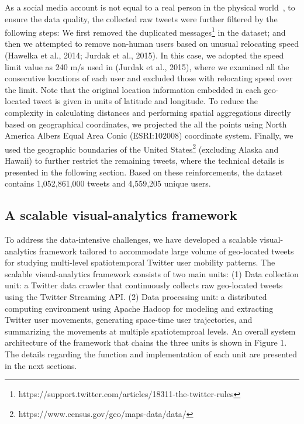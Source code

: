 \documentclass[ijgi,article,submit,moreauthors,pdftex,10pt,a4paper]{mdpi}
\theoremstyle{mdpi}
\newcounter{ex}
\newcounter{re}
\theoremstyle{mdpidefinition}
\begin{document}
As a social media account is not equal to a real person in the physical world~\cite{tsou2015}, to ensure the data quality, the collected raw tweets were further filtered by the following steps: We first removed the duplicated messages\footnote{https://support.twitter.com/articles/18311-the-twitter-rules} in the dataset; and then we attempted to remove non-human users based on unusual relocating speed (Hawelka et al., 2014; Jurdak et al., 2015). 
In this case, we adopted the speed limit value as 240 m/s used in (Jurdak et al., 2015), where we examined all the consecutive locations of each user and excluded those with relocating speed over the limit.
Note that the original location information embedded in each geo-located tweet is given in units of latitude and longitude. To reduce the complexity in calculating distances and performing spatial aggregations directly based on geographical coordinates, we projected the all the points using North America Albers Equal Area Conic (ESRI:102008) coordinate system.
Finally, we used the geographic boundaries of the United States\footnote{https://www.census.gov/geo/maps-data/data/} (excluding Alaska and Hawaii) to further restrict the remaining tweets, where the technical details is presented in the following section. Based on these reinforcements, the dataset contains 1,052,861,000 tweets and 4,559,205 unique users.

\subsection{A scalable visual-analytics framework}
To address the data-intensive challenges, we have developed a scalable visual-analytics framework tailored to accommodate large volume of geo-located tweets for studying multi-level spatiotemporal Twitter user mobility patterns.
The scalable visual-analytics framework consists of two main units: (1) Data collection unit: a Twitter data crawler that continuously collects raw geo-located tweets using the Twitter Streaming API. (2) Data processing unit: a distributed computing environment using Apache Hadoop for modeling and extracting Twitter user movements, generating space-time user trajectories, and summarizing the movements at multiple spatiotemproal levels.
An overall system architecture of the framework that chains the three units is shown in Figure 1. The details regarding the function and implementation of each unit are presented in the next sections.
\end{document}
